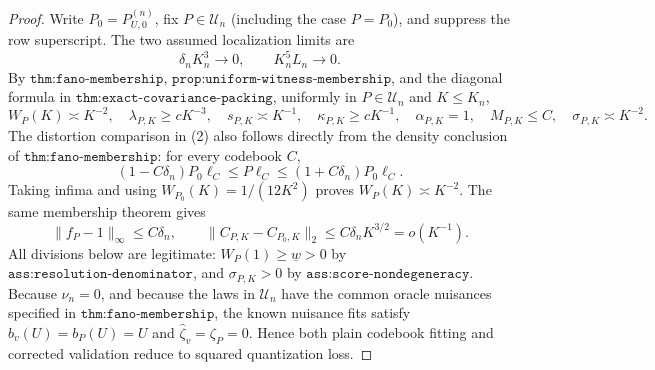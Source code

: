 \documentclass{article}
\begin{document}
\begin{proof}
Write \(P_0=P_{U,0}^{(n)}\), fix \(P\in\mathcal U_n\) (including the case \(P=P_0\)), and suppress the row superscript.  The two assumed localization limits are
\[
 \delta_nK_n^3\longrightarrow0,
 \qquad K_n^5L_n\longrightarrow0.                                             \tag{1}
\]
By \(\texttt{thm:fano-membership}\), \(\texttt{prop:uniform-witness-membership}\), and the diagonal formula in \(\texttt{thm:exact-covariance-packing}\), uniformly in \(P\in\mathcal U_n\) and \(K\leq K_n\),
\[
 W_P(K)\asymp K^{-2},\quad \lambda_{P,K}\geq cK^{-3},\quad
 s_{P,K}\asymp K^{-1},\quad \kappa_{P,K}\geq cK^{-1},\quad
 \alpha_{P,K}=1,\quad M_{P,K}\leq C,\quad \sigma_{P,K}\asymp K^{-2}.        \tag{2}
\]
The distortion comparison in (2) also follows directly from the density conclusion of \(\texttt{thm:fano-membership}\): for every codebook \(C\),
\[
 (1-C\delta_n)P_0\ell_C\leq P\ell_C\leq(1+C\delta_n)P_0\ell_C.
\]
Taking infima and using \(W_{P_0}(K)=1/(12K^2)\) proves \(W_P(K)\asymp K^{-2}\).  The same membership theorem gives
\[
 \|f_P-1\|_\infty\leq C\delta_n,\qquad
 \|C_{P,K}-C_{P_0,K}\|_2\leq C\delta_nK^{3/2}=o(K^{-1}).                    \tag{3}
\]
All divisions below are legitimate: \(W_P(1)\geq\underline w>0\) by \(\texttt{ass:resolution-denominator}\), and \(\sigma_{P,K}>0\) by \(\texttt{ass:score-nondegeneracy}\).  Because \(\nu_n=0\), and because the laws in \(\mathcal U_n\) have the common oracle nuisances specified in \(\texttt{thm:fano-membership}\), the known nuisance fits satisfy \(\widehat b_v(U)=b_P(U)=U\) and \(\widehat\zeta_v=\zeta_P=0\).  Hence both plain codebook fitting and corrected validation reduce to squared quantization loss.


\end{proof}
\end{document}
